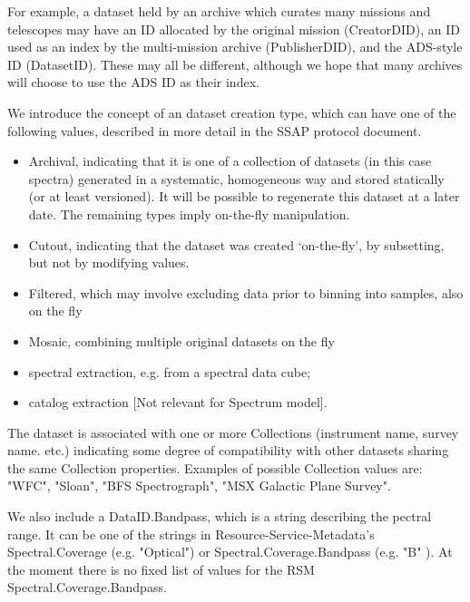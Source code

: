 \documentclass[11pt]{article}
\begin{document}
For example, a dataset held by an archive which curates many
missions and telescopes may have an ID allocated by the original
mission (CreatorDID), an ID used as an index by the multi-mission archive (PublisherDID),
and the ADS-style ID (DatasetID). These may all be different, although
we hope that many archives will choose to use the ADS ID as their index.

We introduce the concept of an dataset creation type, which
can have one of the following  values, described in more
detail in the SSAP protocol document.

\begin{itemize}

\item Archival, indicating that it is one of a collection of
datasets (in this case spectra) generated in a systematic, homogeneous
way and stored statically (or at least versioned). It will be possible
to regenerate this dataset at a later date. The remaining types
imply on-the-fly manipulation.

\item Cutout, indicating that the dataset was created `on-the-fly',
by subsetting, but not by modifying values.

\item Filtered,  which may involve excluding data prior
to binning into samples, also on the fly

\item Mosaic, combining multiple original datasets on the fly

\item spectral extraction, e.g. from a spectral data cube;

\item catalog extraction [Not relevant for Spectrum model].

\end{itemize}


The dataset is associated with one or more Collections (instrument
name, survey name. etc.) indicating some degree of compatibility with other
datasets sharing the same Collection properties. Examples of possible
Collection values are: "WFC", "Sloan", "BFS Spectrograph", "MSX
Galactic Plane Survey".

We also include a DataID.Bandpass, which is a string describing the
pectral range. It can be one of the strings in Resource-Service-Metadata's
Spectral.Coverage (e.g. "Optical") or Spectral.Coverage.Bandpass (e.g. "B" ).
At the moment there is no fixed list of values for the RSM
Spectral.Coverage.Bandpass.
\end{document}
